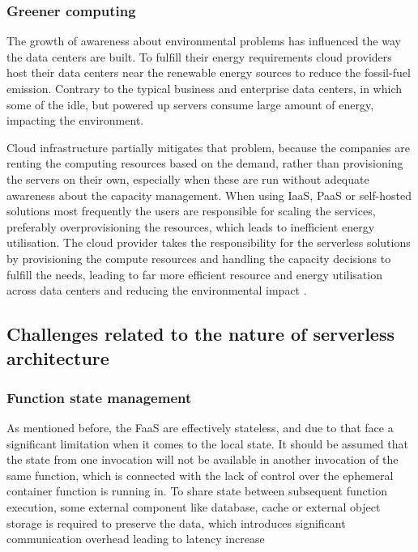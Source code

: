 \subsubsection{Greener computing}

The growth of awareness about environmental problems has influenced the way the data centers are built. To fulfill their energy requirements cloud providers host their data centers near the renewable energy sources to reduce the fossil-fuel emission. Contrary to the typical business and enterprise data centers, in which some of the idle, but powered up servers consume large amount of energy, impacting the environment.

Cloud infrastructure partially mitigates that problem, because the companies are renting the computing resources based on the demand, rather than provisioning the servers on their own, especially when these are run without adequate awareness about the capacity management. When using IaaS, PaaS or self-hosted solutions most frequently the users are responsible for scaling the services, preferably overprovisioning the resources, which leads to inefficient energy utilisation. The cloud provider takes the responsibility for the serverless solutions by provisioning the compute resources and handling the capacity decisions to fulfill the needs, leading to far more efficient resource and energy utilisation across data centers and reducing the environmental impact \cite{MartinFowlerServerless}.

\subsection{Challenges related to the nature of serverless architecture} \label{chapter:serverless-challenges-related-to-the-nature-of-serverless-architecture}

\subsubsection{Function state management}

As mentioned before, the FaaS are effectively stateless, and due to that face a significant limitation when it comes to the local state. It should be assumed that the state from one invocation will not be available in another invocation of the same function, which is connected with the lack of control over the ephemeral container function is running in. To share state between subsequent function execution, some external component like database, cache or external object storage is required to preserve the data, which introduces significant communication overhead leading to latency increase \cite{MartinFowlerServerless}

